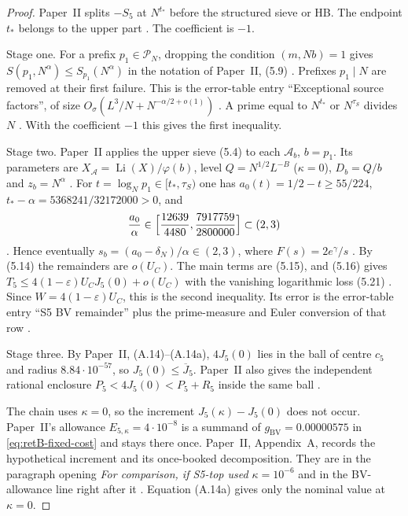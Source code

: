 \begin{proof}
Paper~II splits $-S_5$ at $N^{t_*}$ before the structured sieve or HB.
The endpoint $t_*$ belongs to the upper part \cite[(2.28) and the three
lines after it]{PaperII}. The coefficient is $-1$.

Stage one. For a prefix $p_1\in\mathcal P_N$, dropping the condition
$(m,Nb)=1$ gives $S(p_1,N^\alpha)\le S_{p_1}(N^\alpha)$ in the notation of
Paper~II, (5.9) \cite[the sentence after (5.9)]{PaperII}. Prefixes
$p_1\mid N$ are removed at their first failure. This is the error-table
entry ``Exceptional source factors'', of size
$O_\sigma(L^3/N+N^{-\alpha/2+o(1)})$ \cite[\S6.3]{PaperII}. A prime equal
to $N^{t_*}$ or $N^{\tau_S}$ divides $N$ \cite[after (5.20)]{PaperII}. With
the coefficient $-1$ this gives the first inequality.

Stage two. Paper~II applies the upper sieve (5.4) to each $\mathcal A_b$,
$b=p_1$. Its parameters are $X_{\mathcal A}=\operatorname{Li}(X)/\varphi(b)$, level
$Q=N^{1/2}L^{-B}$ ($\kappa=0$), $D_b=Q/b$ and $z_b=N^\alpha$
\cite[(5.12)]{PaperII}. For $t=\log_Np_1\in[t_*,\tau_S)$ one has
$a_0(t)=1/2-t\ge55/224$, $t_*-\alpha=5368241/32172000>0$, and
\[
 \frac{a_0}{\alpha}\in\Bigl[\frac{12639}{4480},\frac{7917759}{2800000}\Bigr]
 \subset(2,3)
\]
\cite[table after (5.12), row T5]{PaperII}. Hence eventually
$s_b=(a_0-\delta_N)/\alpha\in(2,3)$, where $F(s)=2e^\gamma/s$
\cite[between (5.4) and (5.5)]{PaperII}. By (5.14) the remainders are $o(U_C)$. The main
terms are (5.15), and (5.16) gives
$T_5\le4(1-\varepsilon)U_CJ_5(0)+o(U_C)$ with the vanishing logarithmic
loss (5.21) \cite[(5.14)--(5.16), (5.21) and the sentence ``S5 keeps its
vanishing logarithmic loss'']{PaperII}. Since $W=4(1-\varepsilon)U_C$, this
is the second inequality. Its error is the error-table entry ``S5 BV
remainder'' plus the prime-measure and Euler conversion of that row
\cite[\S6.3]{PaperII}.

Stage three. By Paper~II, (A.14)--(A.14a), $4J_5(0)$ lies in the ball of
centre $c_5$ and radius $8.84\cdot10^{-57}$, so $J_5(0)\le\overline J_5$.
Paper~II also gives the independent rational enclosure
$P_5<4J_5(0)<P_5+R_5$ inside the same ball \cite[after (A.14a)]{PaperII}.

The chain uses $\kappa=0$, so the increment $J_5(\kappa)-J_5(0)$ does not
occur. Paper~II's allowance $E_{5,\kappa}=4\cdot10^{-8}$ is a summand of
$g_{\mathrm{BV}}=0.00000575$ in \eqref{eq:retB-fixed-cost} and stays there
once. Paper~II, Appendix~A, records the hypothetical increment and its
once-booked decomposition. They are in the paragraph opening
\emph{For comparison, if S5-top used $\kappa=10^{-6}$} and in the
BV-allowance line right after it
\cite[Appendix~A, comparison paragraph and following decomposition]{PaperII}.
Equation (A.14a) gives only the nominal value at $\kappa=0$.
\end{proof}

